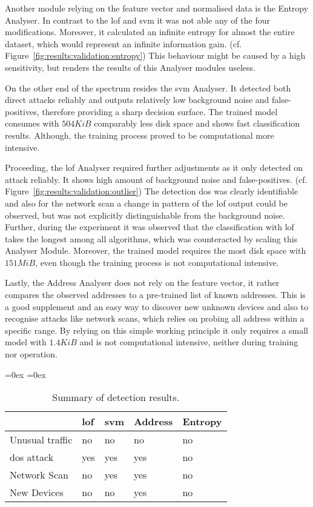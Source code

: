 Another module relying on the feature vector and normalised data is the Entropy Analyser.
In contrast to the \gls{lof} and \gls{svm} it was not able any of the four modifications. Moreover, it calculated an infinite entropy for almost the entire dataset, which would represent an infinite information gain. (cf. Figure~\ref{fig:results:validation:entropy})
This behaviour might be caused by a high sensitivity, but renders the results of this Analyser modules useless.

On the other end of the spectrum resides the \gls{svm} Analyser. It detected both direct attacks reliably and outputs relatively low background noise and false-positives, therefore providing a sharp decision surface.
The trained model consumes with $504 KiB$ comparably less disk space and shows fast classification results. Although, the training process proved to be computational more intensive.

Proceeding, the \gls{lof} Analyser required further adjustments as it only detected on attack reliably.
It shows high amount of background noise and false-positives. (cf. Figure~\ref{fig:results:validation:outlier}) The detection \gls{dos} was clearly identifiable and also for the network scan a change in pattern of the \gls{lof} output could be observed, but was not explicitly distinguishable from the background noise.
Further, during the experiment it was observed that the classification with \gls{lof} takes the longest among all algorithms, which was counteracted by scaling this Analyser Module.
Moreover, the trained model requires the most disk space with $151 MiB$, even though the training process is not computational intensive.

Lastly, the Address Analyser does not rely on the feature vector, it rather compares the observed addresses to a pre-trained list of known addresses. This is a good supplement and an easy way to discover new unknown devices and also to recognise attacks like network scans, which relies on probing all address within a specific range.
By relying on this simple working principle it only requires a small model with $1.4 KiB$ and is not computational intensive, neither during training nor operation.

\begin{table}[H]
	\aboverulesep=0ex
	\belowrulesep=0ex
	\renewcommand{\arraystretch}{1.2}
	
	\centering
	\begin{tabularx}{0.95\textwidth}{|l|Y|Y|Y|Y|}
		\toprule
		& \gls{lof} & \gls{svm} & Address & Entropy \\\midrule
		Unusual traffic & no & no & no & no \\\midrule
		\gls{dos} attack & yes & yes & yes & no \\\midrule
		Network Scan & no & yes & yes & no \\\midrule
		New Devices & no & no & yes & no \\\midrule
	\end{tabularx}
	\caption[Summary of detection results]{Summary of detection results.}
	\label{tab:results:conclusion}
\end{table}

